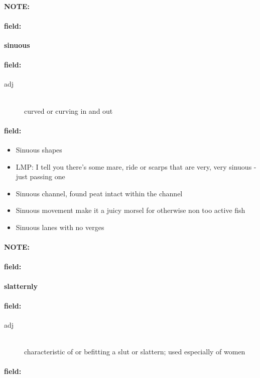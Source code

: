 \documentclass[12pt]{article}
\newenvironment{note}{\paragraph{NOTE:}}{}
\newenvironment{field}{\paragraph{field:}}{}
\begin{document}
\begin{note}
\begin{field}
\textbf{\large sinuous}
\end{field}


\begin{field}
\begin{description}
\item[adj] \hfill \\ 
curved or curving in and out

\end{description}
\end{field}

\begin{field}
\begin{itemize}
\item Sinuous shapes
\item LMP: I tell you there's some mare, ride or scarps that are very, very sinuous - just passing one
\item Sinuous channel, found peat intact within the channel
\item Sinuous movement make it a juicy morsel for otherwise non too active fish
\item Sinuous lanes with no verges
\end{itemize}
\end{field}
\end{note}
\begin{note}
\begin{field}
\textbf{\large slatternly}
\end{field}


\begin{field}
\begin{description}
\item[adj] \hfill \\ 
characteristic of or befitting a slut or slattern; used especially of women

\end{description}
\end{field}

\begin{field}
\end{field}
\end{note}
\end{document}
